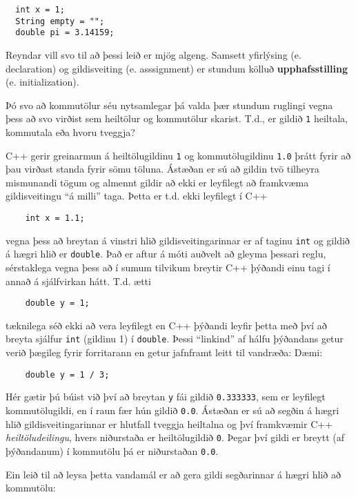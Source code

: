 \begin{verbatim}
  int x = 1;
  String empty = "";
  double pi = 3.14159;
\end{verbatim}
%
Reyndar vill svo til að þessi leið er mjög algeng.
Samsett yfirlýsing (e. declaration) og gildisveiting (e. asssignment) er stundum kölluð {\bf upphafsstilling} (e. initialization).


Þó svo að kommutölur séu nytsamlegar þá valda þær stundum ruglingi vegna þess að svo virðist sem heiltölur og kommutölur skarist. 
T.d., er gildið {\tt 1} heiltala, kommutala eða hvoru tveggja?

C++ gerir greinarmun á heiltölugildinu {\tt 1} og kommutölugildinu {\tt 1.0} þrátt fyrir að þau virðast standa fyrir sömu töluna.
Ástæðan er sú að gildin tvö tilheyra mismunandi tögum og almennt gildir að ekki er leyfilegt að framkvæma gildisveitingu ``á milli'' taga.
Þetta er t.d. ekki leyfilegt í C++

\begin{verbatim}
    int x = 1.1;
\end{verbatim}
%
vegna þess að breytan á vinstri hlið gildisveitingarinnar er af taginu {\tt int} og gildið á hægri hlið er {\tt double}.
Það er aftur á móti auðvelt að gleyma þessari reglu, sérstaklega vegna þess að í sumum tilvikum breytir C++ þýðandi einu tagi í annað á sjálfvirkan hátt.
T.d. ætti 

\begin{verbatim}
    double y = 1;
\end{verbatim}
%
tæknilega séð ekki að vera leyfilegt en C++ þýðandi leyfir þetta með því að breyta sjálfur
{\tt int} (gildinu 1) í {\tt double}.
Þessi ``linkind'' af hálfu þýðandans getur verið þægileg fyrir forritarann en getur jafnframt leitt til vandræða:
Dæmi:

\begin{verbatim}
    double y = 1 / 3;
\end{verbatim}
%
Hér gætir þú búist við því að breytan {\tt y} fái gildið {\tt 0.333333}, sem er leyfilegt kommutölugildi, en í raun fær hún gildið {\tt 0.0}.
Ástæðan er sú að segðin á hægri hlið gildisveitingarinnar er hlutfall tveggja heiltalna og því framkvæmir C++ {\em heiltöludeilingu}, hvers niðurstaða er heiltölugildið {\tt 0}.
Þegar því gildi er breytt (af þýðandanum) í kommutölu þá er niðurstaðan {\tt 0.0}.

Ein leið til að leysa þetta vandamál er að gera gildi segðarinnar á hægri hlið að kommutölu:

